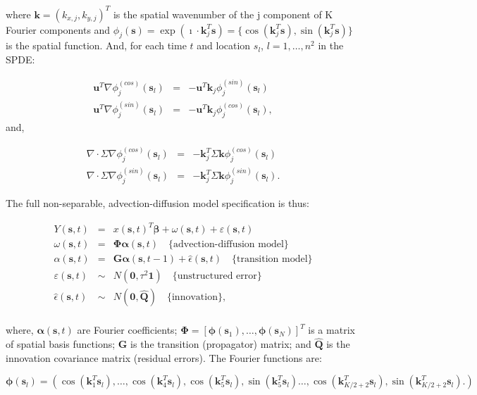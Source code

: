 \documentclass[letterpaper,portrait,11pt]{scrartcl}
\numberwithin{equation}{section}    %
\numberwithin{figure}{section}    %
\numberwithin{table}{section}       %
\begin{document}
\begin{appendices}
  where $\bm{k}=(k_{x,j}, k_{y,j} )^T$ is the spatial wavenumber of the j component of K Fourier components and $\phi_j(\bm{s}) = \exp(\imath \cdot \bm{k}_j^T\bm{s} ) = \{ \cos( \bm{k}_j^T\bm{s}),  \sin( \bm{k}_j^T\bm{s} ) \}$ is the spatial function. And, for each time $t$ and location $s_l$, $l=1,\dots, n^2$ in the SPDE:

  \begin{eqnarray*}
    \bm{u}^T \nabla \phi_j^{(cos)}(\bm{s}_l) &=& -\bm{u}^T \bm{k}_j \phi_j^{(sin)} (\bm{s}_l) \\
    \bm{u}^T \nabla \phi_j^{(sin)}(\bm{s}_l) &=& -\bm{u}^T \bm{k}_j \phi_j^{(cos)} (\bm{s}_l),
  \end{eqnarray*}
 and,

  \begin{eqnarray*}
    \nabla \cdot \Sigma \nabla \phi_j^{(cos)}(\bm{s}_l) &=& -\bm{k}_j^T \Sigma \bm{k} \phi_j^{(cos)} (\bm{s}_l) \\
    \nabla \cdot \Sigma \nabla \phi_j^{(sin)}(\bm{s}_l) &=& -\bm{k}_j^T \Sigma \bm{k} \phi_j^{(sin)} (\bm{s}_l) .
  \end{eqnarray*}


The full non-separable, advection-diffusion model specification is thus:

  \begin{eqnarray*}
    Y(\bm{s},t) &=& x(\bm{s},t)^{T} \bm{\beta} +  \omega(\bm{s},t) + \varepsilon(\bm{s},t) \\
    \omega(\bm{s},t) &=& \bm{\Phi} \bm{\alpha} (\bm{s},t)  \quad \text{\{advection-diffusion model\}}\\
    \alpha (\bm{s},t)&=& \bm{G} \bm{\alpha} (\bm{s},t-1) + \hat{\epsilon}(\bm{s},t)  \quad \text{\{transition model\}} \\
    \varepsilon(\bm{s},t) &\sim& N(\bm{0}, \tau^2 \bm{1} ) \quad \text{\{unstructured error\}}\\
    \hat{\epsilon}(\bm{s},t) &\sim& N(\bm{0}, \bm{\hat{Q}})  \quad \text{\{innovation\}} , \\
  \end{eqnarray*}

 where, $\bm{\alpha} (\bm{s},t)$ are Fourier coefficients; $\bm{\Phi}=[ \bm{\phi}(\bm{s}_1), \dots, \bm{\phi}(\bm{s}_N) ]^T$ is a matrix of spatial basis functions; $\bm{G}$ is the transition (propagator) matrix; and $\bm{\hat{Q}}$ is the  innovation covariance matrix (residual errors). The Fourier functions are:

 \[
 \bm{\phi}(\bm{s}_l) = ( \cos(\bm{k}^T_1\bm{s}_l),  \dots , \cos(\bm{k}^T_4\bm{s}_l),
   \cos(\bm{k}^T_5\bm{s}_l), \sin(\bm{k}^T_5\bm{s}_l)\dots,
   \cos(\bm{k}^T_{K/2+2}\bm{s}_l), \sin(\bm{k}^T_{K/2+2}\bm{s}_l).
 )
 \]



\end{appendices}
\end{document}
